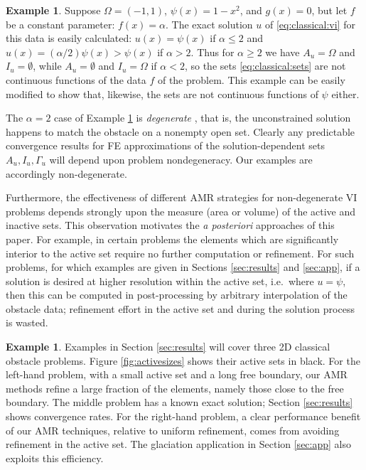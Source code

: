 \documentclass[]{interact}
\theoremstyle{plain}%
\theoremstyle{definition}
\newtheorem{example}[theorem]{Example}
\theoremstyle{remark}
\begin{document}
\begin{example} \label{example:notcontinuous}  Suppose $\Omega = (-1,1)$, $\psi(x)=1 - x^2$, and $g(x)=0$, but let $f$ be a constant parameter: $f(x)=\alpha$.  The exact solution $u$ of \eqref{eq:classical:vi} for this data is easily calculated: $u(x)=\psi(x)$ if $\alpha\le 2$ and $u(x)=(\alpha/2)\psi(x)>\psi(x)$ if $\alpha>2$.  Thus for $\alpha \ge 2$ we have $A_u=\Omega$ and $I_u=\emptyset$, while $A_u=\emptyset$ and $I_u=\Omega$ if $\alpha<2$, so the sets \eqref{eq:classical:sets} are not continuous functions of the data $f$ of the problem.  This example can be easily modified to show that, likewise, the sets are not continuous functions of $\psi$ either.
\end{example}

The $\alpha=2$ case of Example \ref{example:notcontinuous} is \emph{degenerate} \cite{KinderlehrerStampacchia1980}, that is, the unconstrained solution happens to match the obstacle on a nonempty open set.  Clearly any predictable convergence results for FE approximations of the solution-dependent sets $A_u,I_u,\Gamma_u$ will depend upon problem nondegeneracy.  Our examples are accordingly non-degenerate.

Furthermore, the effectiveness of different AMR strategies for non-degenerate VI problems depends strongly upon the measure (area or volume) of the active and inactive sets.  This observation motivates the \emph{a posteriori} approaches of this paper.  For example, in certain problems the elements which are significantly interior to the active set require no further computation or refinement.  For such problems, for which examples are given in Sections \ref{sec:results} and \ref{sec:app}, if a solution is desired at higher resolution within the active set, i.e.~where $u=\psi$, then this can be computed in post-processing by arbitrary interpolation of the obstacle data; refinement effort in the active set and during the solution process is wasted.

\begin{example} \label{example:activesets} Examples in Section \ref{sec:results} will cover three 2D classical obstacle problems.  Figure \ref{fig:activesizes} shows their active sets in black.  For the left-hand problem, with a small active set and a long free boundary, our AMR methods refine a large fraction of the elements, namely those close to the free boundary.  The middle problem has a known exact solution; Section \ref{sec:results} shows convergence rates.  For the right-hand problem, a clear performance benefit of our AMR techniques, relative to uniform refinement, comes from avoiding refinement in the active set.  The glaciation application in Section \ref{sec:app} also exploits this efficiency. \end{example}
\end{document}
